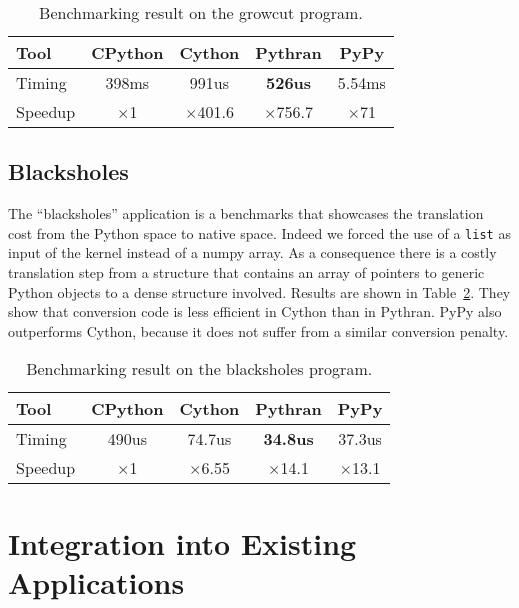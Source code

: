\documentclass[10pt, onecolumn, preprint]{sigplanconf}
\begin{document}
\begin{table}
    \centering

    \begin{tabular}{|l|c|c|c|c|}
        \hline
     Tool    &  CPython    &   Cython     &     Pythran   &  PyPy \\
    \hline
    Timing  &  398ms   &   991us     &    \textbf{526us} &  5.54ms  \\
    \hline
    Speedup &  $\times$1         &    $\times$401.6      &    $\times$756.7   &  $\times$71    \\
    \hline
\end{tabular}
\caption{Benchmarking result on the growcut program.}
\label{tbl:growcut}

\end{table}

\subsection{Blacksholes}

The ``blacksholes'' application is a benchmarks that showcases the
translation cost from the Python space to native space. Indeed we forced the
use of a \texttt{list} as input of the kernel instead of a numpy array. As a
consequence there is a costly translation step from a structure that contains
an array of pointers to generic Python objects to a dense structure involved.
Results are shown in Table~\ref{tbl:black}. They show that conversion code is
less efficient in Cython than in Pythran. PyPy also outperforms Cython, because
it does not suffer from a similar conversion penalty.

\begin{table}
    \centering

    \begin{tabular}{|l|c|c|c|c|}
        \hline
     Tool    &  CPython    &   Cython     &     Pythran   &  PyPy \\
    \hline
    Timing  &  490us   &   74.7us     &    \textbf{34.8us} &  37.3us  \\
    \hline
    Speedup &  $\times$1         &    $\times$6.55      &    $\times$14.1   &  $\times$13.1    \\
    \hline
\end{tabular}
\caption{Benchmarking result on the blacksholes program.}
\label{tbl:black}

\end{table}

\section{Integration into Existing Applications}
\end{document}

